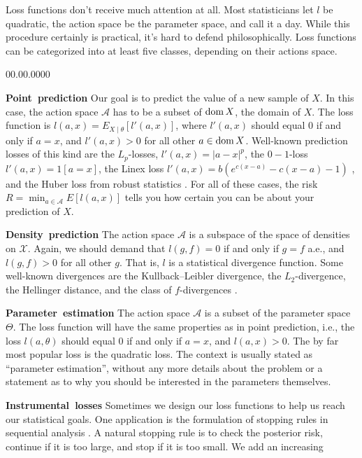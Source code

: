 Loss functions don't receive much attention at all. Most statisticians
let $l$ be quadratic, the action space be the parameter space, and
call it a day. While this procedure certainly is practical, it's hard
to defend philosophically. Loss functions can be categorized into
at least five classes, depending on their actions space.
\begin{lyxlist}{00.00.0000}
\item [{\textbf{Point~prediction}}] Our goal is to predict the value of
a new sample of $X$. In this case, the action space $\mathcal{A}$
has to be a subset of $\operatorname{dom} X$, the domain of $X$. The loss function
is $l(a,x)=E_{X\mid\theta}[l'(a,x)]$, where $l'(a,x)$ should equal
$0$ if and only if $a=x$, and $l'(a,x)>0$ for all other $a\in\operatorname{dom} X$.
Well-known prediction losses of this kind are the $L_{p}$-losses,
$l'(a,x)=|a-x|^{p}$, the $0-1$-loss $l'(a,x)=1[a=x]$, the Linex
loss $l'(a,x)=b(e^{c(x-a)}-c(x-a)-1)$ \parencite{Varian1975-cd}, and
the Huber loss from robust statistics \parencite{Huber1964-fm}. For all
of these cases, the risk $R=\min_{a\in\mathcal{A}}E[l(a,x)]$ tells
you how certain you can be about your prediction of $X$.
\item [{\textbf{Density~prediction}}] The action space $\mathcal{A}$
is a subspace of the space of densities on $\mathcal{X}$. Again,
we should demand that $l(g,f)=0$ if and only if $g=f$ a.e., and
$l(g,f)>0$ for all other $g$. That is, $l$ is a statistical divergence
function. Some well-known divergences are the Kullback--Leibler divergence,
the $L_{2}$-divergence, the Hellinger distance, and the class of
$f$-divergences \parencite{Basu2011-gs}. 
\item [{\textbf{Parameter~estimation}}] The action space $\mathcal{A}$
is a subset of the parameter space $\Theta$. The loss function will
have the same properties as in point prediction, i.e., the loss $l(a,\theta)$
should equal $0$ if and only if $a=x$, and $l(a,x)>0$. The by far
most popular loss is the quadratic loss. The context is usually stated
as ``parameter estimation'', without any more details about the
problem or a statement as to why you should be interested in the parameters
themselves.
\item [{\textbf{Instrumental~losses}}] Sometimes we design our loss functions
to help us reach our statistical goals. One application is the formulation
of stopping rules in sequential analysis \parencite{Brockwell2003-pd}.
A natural stopping rule is to check the posterior risk, continue if
it is too large, and stop if it is too small. We add an increasing

\end{lyxlist}
